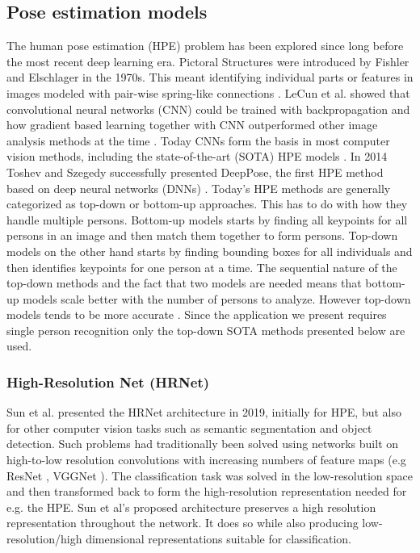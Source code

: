 \subsection{Pose estimation models}
The human pose estimation (HPE) problem has been explored since long before the most recent deep learning era. Pictoral Structures were introduced by Fishler and Elschlager in the 1970s. This meant identifying individual parts or features in images modeled with pair-wise spring-like connections \cite{Fischler1973}. LeCun et al. showed that convolutional neural networks (CNN) could be trained with backpropagation \cite{LeCun1989} and how gradient based learning together with CNN outperformed other image analysis methods at the time \cite{LeCun1998}. Today CNNs form the basis in most computer vision methods, including the state-of-the-art (SOTA) HPE models \cite{Newell2016, Sun2019}. In 2014 Toshev and Szegedy successfully presented DeepPose, the first HPE method based on deep neural networks (DNNs) \cite{Toshev2014}. Today's HPE methods are generally categorized as top-down or bottom-up approaches. This has to do with how they handle multiple persons. Bottom-up models starts by finding all keypoints for all persons in an image and then match them together to form persons. Top-down models on the other hand starts by finding bounding boxes for all individuals and then identifies keypoints for one person at a time. The sequential nature of the top-down methods and the fact that two models are needed means that bottom-up models scale better with the number of persons to analyze. However top-down models tends to be more accurate \cite{Cheng2019}. Since the application we present requires single person recognition only the top-down SOTA methods presented below are used.

\subsubsection{High-Resolution Net (HRNet)} \label{sec:hrnet}
Sun et al. \cite{Sun2019} presented the HRNet architecture in 2019, initially for HPE, but also for other computer vision tasks such as semantic segmentation and object detection. Such problems had traditionally been solved using networks built on high-to-low resolution convolutions with increasing numbers of feature maps (e.g ResNet \cite{He2016}, VGGNet \cite{Simonyan2015}). The classification task was solved in the low-resolution space and then transformed back to form the high-resolution representation needed for e.g. the HPE. Sun et al's proposed architecture preserves a high resolution representation throughout the network. It does so while also producing low-resolution/high dimensional representations suitable for classification.

